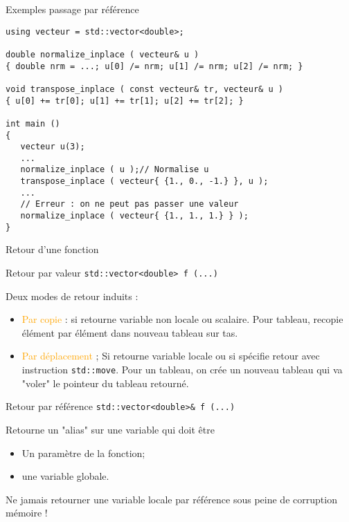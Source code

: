 \documentclass[handout,10pt]{beamer}
\begin{document}
\begin{frame}[fragile]{Exemples passage par référence}
\tiny
\begin{lstlisting}
using vecteur = std::vector<double>;

double normalize_inplace ( vecteur& u )
{ double nrm = ...; u[0] /= nrm; u[1] /= nrm; u[2] /= nrm; }

void transpose_inplace ( const vecteur& tr, vecteur& u )
{ u[0] += tr[0]; u[1] += tr[1]; u[2] += tr[2]; }

int main ()
{
   vecteur u(3);
   ...
   normalize_inplace ( u );// Normalise u
   transpose_inplace ( vecteur{ {1., 0., -1.} }, u );
   ...
   // Erreur : on ne peut pas passer une valeur
   normalize_inplace ( vecteur{ {1., 1., 1.} } );
}
\end{lstlisting}
\end{frame}

\begin{frame}[fragile]{Retour d'une fonction}
\tiny
\begin{block}{Retour par valeur}
\lstinline{std::vector<double> f (...)}

Deux modes de retour induits : 
\begin{itemize}
\item {\textcolor{orange}{Par copie}} : si retourne variable non locale ou scalaire. Pour tableau, recopie élément par élément dans nouveau tableau sur tas.
\item {\textcolor{orange}{Par déplacement}} ; Si retourne variable locale ou si spécifie retour avec instruction \lstinline$std::move$. Pour un tableau, on crée un nouveau tableau qui va "voler" le pointeur du tableau retourné.
\end{itemize}
\end{block}

\begin{block}{Retour par référence}
\lstinline{std::vector<double>& f (...)}

Retourne un "alias" sur une variable qui doit être 
\begin{itemize}
\item Un paramètre de la fonction;
\item une variable globale.
\end{itemize}
\alert{Ne jamais retourner une variable locale par référence sous peine de corruption mémoire !}
\end{block}
\end{frame}
\end{document}
